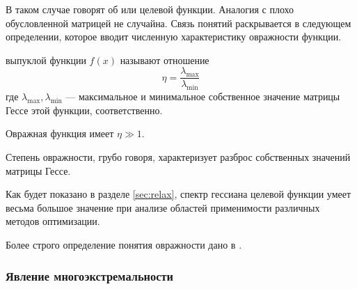 В таком случае говорят об  или  целевой функции. Аналогия с плохо обусловленной
матрицей не случайна. Связь понятий раскрывается в следующем
определении, которое вводит численную характеристику овражности
функции.

\begin{dfn}
  \label{dfn:ill-cond}
   выпуклой функции $f(x)$ называют
  отношение
  \begin{equation*}
    \eta = \frac{\lambda_{\max}}{\lambda_{\min}}
  \end{equation*}
  где $\lambda_{\max}, \lambda_{\min}$ — максимальное и минимальное
  собственное значение матрицы Гессе этой функции, соответственно.
\end{dfn}

Овражная функция имеет $\eta \gg 1$.

Степень овражности, грубо говоря, характеризует разброс собственных
значений матрицы Гессе. 

Как будет показано в разделе \ref{sec:relax}, спектр гессиана целевой
функции умеет весьма большое значение при анализе областей
применимости различных методов оптимизации.

Более строго определение понятия овражности дано в
\cite{chernorutsky04}.

\subsubsection{Явление многоэкстремальности}
